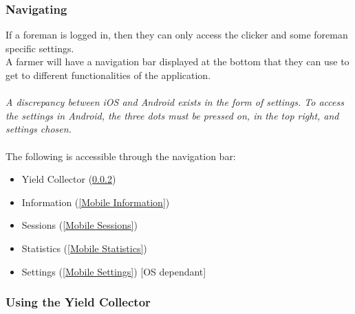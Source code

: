 \documentclass[11pt]{article}
\begin{document}
\subsubsection{Navigating}
If a foreman is logged in, then they can only access the clicker and some foreman specific settings.\\
A farmer will have a navigation bar displayed at the bottom that they can use to get to different functionalities of the application.\\
\\
\textit{A discrepancy between iOS and Android exists in the form of settings. To access the settings in Android, the three dots must be pressed on, in the top right, and settings chosen.}\\
\\
The following is accessible through the navigation bar:
\begin{itemize}
\item Yield Collector (\ref{Mobile Yield Collector})
\item Information (\ref{Mobile Information})
\item Sessions (\ref{Mobile Sessions})
\item Statistics (\ref{Mobile Statistics})
\item Settings (\ref{Mobile Settings}) [OS dependant]
\end{itemize}
\subsubsection{Using the Yield Collector}
\label{Mobile Yield Collector}
\end{document}

